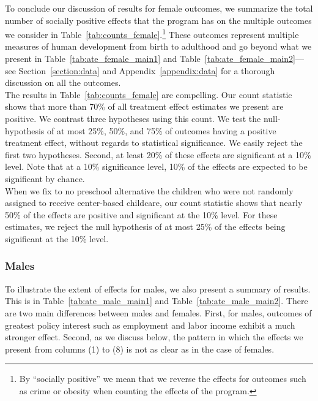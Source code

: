 \noindent To conclude our discussion of results for female outcomes, we summarize the total number of socially positive effects that the program has on the multiple outcomes we consider in Table~\ref{tab:counts_female}.\footnote{By ``socially positive'' we mean that we reverse the effects for outcomes such as crime or obesity when counting the effects of the program.} These outcomes represent multiple measures of human development from birth to adulthood and go beyond what we present in Table~\ref{tab:ate_female_main1} and Table~\ref{tab:ate_female_main2}---see Section~\ref{section:data} and Appendix~\ref{appendix:data} for a thorough discussion on all the outcomes.\\ 

\noindent The results in Table~\ref{tab:counts_female} are compelling. Our count statistic shows that more than 70\% of all treatment effect estimates we present are positive. We contrast three hypotheses using this count. We test the null-hypothesis of at most 25\%, 50\%, and 75\% of outcomes having a positive treatment effect, without regards to statistical significance. We easily reject the first two hypotheses. Second, at least 20\% of these effects are significant at a 10\% level. Note that at a 10\% significance level, 10\% of the effects are expected to be significant by chance.\\

\noindent When we fix to no preschool alternative the children who were not randomly assigned to receive center-based childcare, our count statistic shows that nearly 50\% of the effects are positive and significant at the 10\% level. For these estimates, we reject the null hypothesis of at most 25\% of the effects being significant at the 10\% level. \\





\subsubsection{Males} \label{section:centermales}

\noindent To illustrate the extent of effects for males, we also present a summary of results. This is in Table~\ref{tab:ate_male_main1} and Table~\ref{tab:ate_male_main2}. There are two main differences between males and females. First, for males, outcomes of greatest policy interest such as employment and labor income exhibit a much stronger effect. Second, as we discuss below, the pattern in which the effects we present from columns (1) to (8) is not as clear as in the case of females.\\

